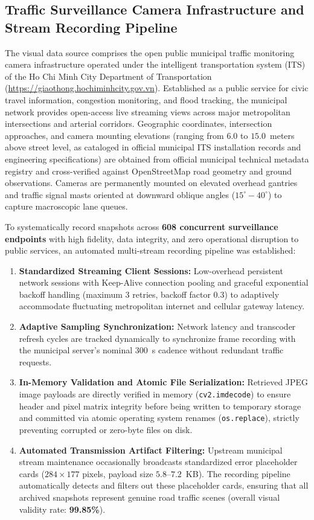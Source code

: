\documentclass[preprint,12pt]{elsarticle}
\begin{document}
\subsection{Traffic Surveillance Camera Infrastructure and Stream Recording Pipeline}
The visual data source comprises the open public municipal traffic monitoring camera infrastructure operated under the intelligent transportation system (ITS) of the Ho Chi Minh City Department of Transportation (\url{https://giaothong.hochiminhcity.gov.vn}). Established as a public service for civic travel information, congestion monitoring, and flood tracking, the municipal network provides open-access live streaming views across major metropolitan intersections and arterial corridors. Geographic coordinates, intersection approaches, and camera mounting elevations (ranging from $\mathbf{6.0}$ to $\mathbf{15.0}$~meters above street level, as cataloged in official municipal ITS installation records and engineering specifications) are obtained from official municipal technical metadata registry and cross-verified against OpenStreetMap road geometry and ground observations. Cameras are permanently mounted on elevated overhead gantries and traffic signal masts oriented at downward oblique angles ($15^\circ - 40^\circ$) to capture macroscopic lane queues.

To systematically record snapshots across \textbf{608 concurrent surveillance endpoints} with high fidelity, data integrity, and zero operational disruption to public services, an automated multi-stream recording pipeline was established:
\begin{enumerate}
    \item \textbf{Standardized Streaming Client Sessions:} Low-overhead persistent network sessions with Keep-Alive connection pooling and graceful exponential backoff handling (maximum $3$ retries, backoff factor $0.3$) to adaptively accommodate fluctuating metropolitan internet and cellular gateway latency.
    \item \textbf{Adaptive Sampling Synchronization:} Network latency and transcoder refresh cycles are tracked dynamically to synchronize frame recording with the municipal server's nominal $300$~s cadence without redundant traffic requests.
    \item \textbf{In-Memory Validation and Atomic File Serialization:} Retrieved JPEG image payloads are directly verified in memory (\texttt{cv2.imdecode}) to ensure header and pixel matrix integrity before being written to temporary storage and committed via atomic operating system renames (\texttt{os.replace}), strictly preventing corrupted or zero-byte files on disk.
    \item \textbf{Automated Transmission Artifact Filtering:} Upstream municipal stream maintenance occasionally broadcasts standardized error placeholder cards ($284 \times 177$ pixels, payload size $5.8$--$7.2$~KB). The recording pipeline automatically detects and filters out these placeholder cards, ensuring that all archived snapshots represent genuine road traffic scenes (overall visual validity rate: \textbf{99.85\%}).
\end{enumerate}
\end{document}
